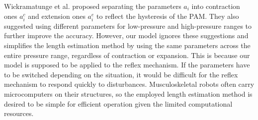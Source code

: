 Wickramatunge et al. proposed separating the parameters $a_i$ into contraction ones $a^c_i$ and extension ones $a^e_i$ to reflect the hysteresis of the PAM\cite{spring}. They also suggested using different parameters for low-pressure and high-pressure ranges to further improve the accuracy. However, our model ignores these suggestions and simplifies the length estimation method by using the same parameters across the entire pressure range, regardless of contraction or expansion. This is because our model is supposed to be applied to the reflex mechanism. If the parameters have to be switched depending on the situation, it would be difficult for the reflex mechanism to respond quickly to disturbances.
Musculoskeletal robots often carry microcomputers on their structures, so the employed length estimation method is desired to be simple for efficient operation given the limited computational resources.



 



